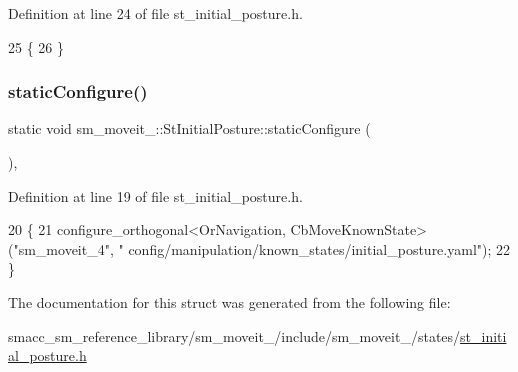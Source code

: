 Definition at line 24 of file st\+\_\+initial\+\_\+posture.\+h.


\begin{DoxyCode}
25     \{
26     \}
\end{DoxyCode}
\mbox{\label{structsm__moveit__4_1_1StInitialPosture_a64aa9970704ab8c38a22cae53a5750df}} 
\subsubsection{\texorpdfstring{static\+Configure()}{staticConfigure()}}
{\footnotesize\ttfamily static void sm\+\_\+moveit\+\_\+::\+St\+Initial\+Posture\+::static\+Configure (\begin{DoxyParamCaption}{ }\end{DoxyParamCaption})\hspace{0.3cm}{\ttfamily [inline]}, {\ttfamily [static]}}



Definition at line 19 of file st\+\_\+initial\+\_\+posture.\+h.


\begin{DoxyCode}
20     \{
21         configure\_orthogonal<OrNavigation, CbMoveKnownState>(\textcolor{stringliteral}{"sm\_moveit\_4"}, \textcolor{stringliteral}{"
      config/manipulation/known\_states/initial\_posture.yaml"});
22     \}
\end{DoxyCode}


The documentation for this struct was generated from the following file\+:\begin{DoxyCompactItemize}
\item 
smacc\+\_\+sm\+\_\+reference\+\_\+library/sm\+\_\+moveit\+\_/include/sm\+\_\+moveit\+\_/states/\hyperlink{4_2include_2sm__moveit__4_2states_2st__initial__posture_8h}{st\+\_\+initial\+\_\+posture.\+h}\end{DoxyCompactItemize}
